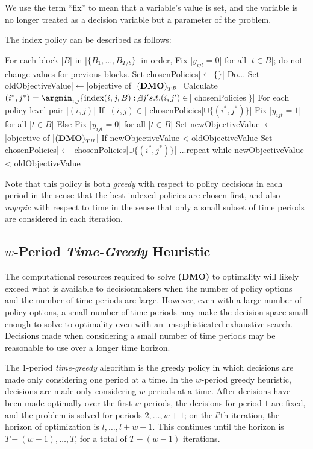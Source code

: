 \documentclass{article}
\newcommand{\model}{{\bf (DMO) }}
\begin{document}
We use the term ``fix'' to mean that a variable's value is set, and the variable is no longer treated as a decision variable but a parameter of the problem.


The index policy can be described as follows:
\begin{pseudocode}
    For each block |$B$| in |$\{B_1,\ldots,B_{T/b}\}$| in order,
        Fix |$y_{ijt}=0$| for all |$t\in B$|; do not change values for previous blocks.
        Set chosenPolicies|$\leftarrow\{\}$|
        Do...
            Set oldObjectiveValue|$\leftarrow$|objective of |$\model_{T^B}$|
            Calculate |$(i^*,j^*) = \argmin_{i,j}\{\text{index}(i,j,B) : \not\exists j' s.t. (i,j')\in$| chosenPolicies|$\}$|
            For each policy-level pair |$(i,j)$|
                If |$(i,j)\in$| chosenPolicies|$\cup \{(i^*,j^*)\}$|
                    Fix |$y_{ijt}=1$| for all |$t\in B$|
                Else
                    Fix |$y_{ijt}=0$| for all |$t\in B$|
            Set newObjectiveValue|$\leftarrow$|objective of |$\model_{T^B}$|
            If newObjectiveValue < oldObjectiveValue
                Set chosenPolicies|$\leftarrow$|chosenPolicies|$\cup\{(i^*,j^*)\}$|
        ...repeat while newObjectiveValue < oldObjectiveValue
\end{pseudocode}


Note that this policy is both \emph{greedy} with respect to policy decisions in each period in the sense that the best indexed policies are chosen first, and also \emph{myopic} with respect to time in the sense that only a small subset of time periods are considered in each iteration.


\subsection{$w$-Period \emph{Time-Greedy} Heuristic}

The computational resources required to solve \model to optimality will likely exceed what is available to decisionmakers when the number of policy options and the number of time periods are large. However, even with a large number of policy options, a small number of time periods may make the decision space small enough to solve to optimality even with an unsophisticated exhaustive search. Decisions made when considering a small number of time periods may be reasonable to use over a longer time horizon.

The $1$-period \emph{time-greedy} algorithm is the greedy policy in which decisions are made only considering one period at a time. In the $w$-period greedy heuristic, decisions are made only considering $w$ periods at a time. After decisions have been made optimally over the first $w$ periods, the decisions for period $1$ are fixed, and the problem is solved for periods $2,\ldots,w+1$; on the $l$'th iteration, the horizon of optimization is $l,\ldots,l+w-1$. This continues until the horizon is $T-(w-1),\ldots,T$, for a total of $T-(w-1)$ iterations.
\end{document}
